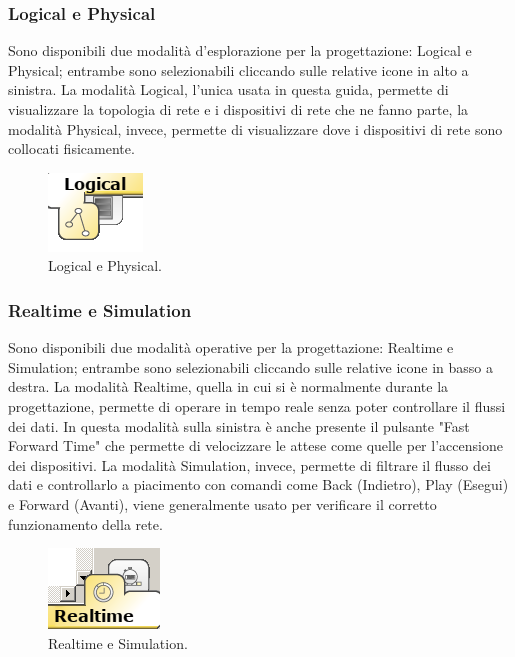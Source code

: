 \subsubsection{Logical e Physical}
Sono disponibili due modalità d'esplorazione per la progettazione: Logical e Physical; entrambe sono selezionabili cliccando sulle relative icone in alto a sinistra. La modalità Logical, l'unica usata in questa guida, permette di visualizzare la topologia di rete e i dispositivi di rete che ne fanno parte, la modalità Physical, invece, permette di visualizzare dove i dispositivi di rete sono collocati fisicamente.

\begin{figure}[htbp]
    \centerline{\includegraphics[scale=.6]{images/02.packet-tracer/logical_physical.png}}
    \caption{Logical e Physical.}
\end{figure}

\subsubsection{Realtime e Simulation}
Sono disponibili due modalità operative per la progettazione: Realtime e Simulation; entrambe sono selezionabili cliccando sulle relative icone in basso a destra. La modalità Realtime, quella in cui si è normalmente durante la progettazione, permette di operare in tempo reale senza poter controllare il flussi dei dati. In questa modalità sulla sinistra è anche presente il pulsante "Fast Forward Time" che permette di velocizzare le attese come quelle per l'accensione dei dispositivi. La modalità Simulation, invece, permette di filtrare il flusso dei dati e controllarlo a piacimento con comandi come Back (Indietro), Play (Esegui) e Forward (Avanti), viene generalmente usato per verificare il corretto funzionamento della rete. 

\begin{figure}[htbp]
    \centerline{\includegraphics[scale=.5]{images/02.packet-tracer/realtime_simulation.png}}
    \caption{Realtime e Simulation.}
\end{figure}

